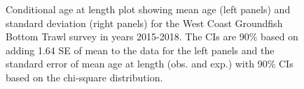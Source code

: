\documentclass[
]{scrartcl}
\begin{document}
\begin{figure}[H]


\caption{\label{fig-call-plot-wcgbts4}Conditional age at length plot
showing mean age (left panels) and standard deviation (right panels) for
the West Coast Groundfish Bottom Trawl survey in years 2015-2018. The
CIs are 90\% based on adding 1.64 SE of mean to the data for the left
panels and the standard error of mean age at length (obs. and exp.) with
90\% CIs based on the chi-square distribution.}

\end{figure}%
\end{document}
